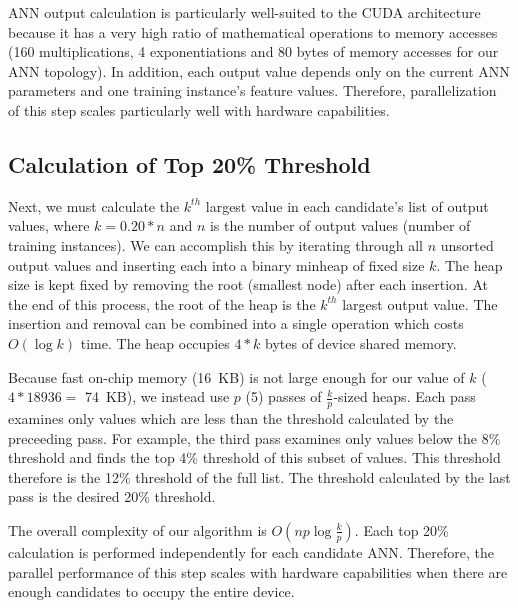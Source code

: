 \documentclass[letterpaper]{jpconf}       %
\begin{document}
ANN output calculation is particularly well-suited to the CUDA architecture because it has a very high ratio of mathematical operations to memory accesses (160 multiplications, 4 exponentiations and 80 bytes of memory accesses for our ANN topology). In addition, each output value depends only on the current ANN parameters and one training instance's feature values. Therefore, parallelization of this step scales particularly well with hardware capabilities.

\subsection{Calculation of Top 20\% Threshold} \label{top20}
Next, we must calculate the $k^{th}$ largest value in each candidate's list of output values, where $k = 0.20 * n$ and $n$ is the number of output values (number of training instances). We can accomplish this by iterating through all $n$ unsorted output values and inserting each into a binary minheap of fixed size $k$. The heap size is kept fixed by removing the root (smallest node) after each insertion. At the end of this process, the root of the heap is the $k^{th}$ largest output value. The insertion and removal can be combined into a single operation which costs $O(\log k)$ time. The heap occupies $4 * k$ bytes of device shared memory.

Because fast on-chip memory (16~KB) is not large enough for our value of $k$ ($4 * 18936 =$ 74~KB), we instead use $p$ (5) passes of $\frac{k}{p}$-sized heaps. Each pass examines only values which are less than the threshold calculated by the preceeding pass. For example, the third pass examines only values below the 8\% threshold and finds the top 4\% threshold of this subset of values. This threshold therefore is the 12\% threshold of the full list. The threshold calculated by the last pass is the desired 20\% threshold.

The overall complexity of our algorithm is $O(np \log \frac{k}{p})$. Each top 20\% calculation is performed independently for each candidate ANN. Therefore, the parallel performance of this step scales with hardware capabilities when there are enough candidates to occupy the entire device.

\end{document}
